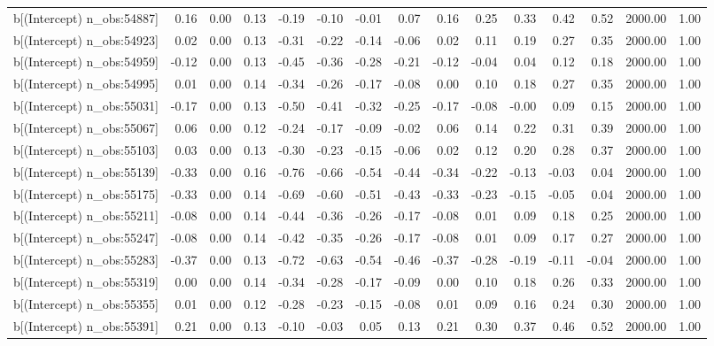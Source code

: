 \begin{table}[ht]
\begin{tabular}{rrrrrrrrrrrrrrr}
  b[(Intercept) n\_obs:54887] & 0.16 & 0.00 & 0.13 & -0.19 & -0.10 & -0.01 & 0.07 & 0.16 & 0.25 & 0.33 & 0.42 & 0.52 & 2000.00 & 1.00 \\ 
  b[(Intercept) n\_obs:54923] & 0.02 & 0.00 & 0.13 & -0.31 & -0.22 & -0.14 & -0.06 & 0.02 & 0.11 & 0.19 & 0.27 & 0.35 & 2000.00 & 1.00 \\ 
  b[(Intercept) n\_obs:54959] & -0.12 & 0.00 & 0.13 & -0.45 & -0.36 & -0.28 & -0.21 & -0.12 & -0.04 & 0.04 & 0.12 & 0.18 & 2000.00 & 1.00 \\ 
  b[(Intercept) n\_obs:54995] & 0.01 & 0.00 & 0.14 & -0.34 & -0.26 & -0.17 & -0.08 & 0.00 & 0.10 & 0.18 & 0.27 & 0.35 & 2000.00 & 1.00 \\ 
  b[(Intercept) n\_obs:55031] & -0.17 & 0.00 & 0.13 & -0.50 & -0.41 & -0.32 & -0.25 & -0.17 & -0.08 & -0.00 & 0.09 & 0.15 & 2000.00 & 1.00 \\ 
  b[(Intercept) n\_obs:55067] & 0.06 & 0.00 & 0.12 & -0.24 & -0.17 & -0.09 & -0.02 & 0.06 & 0.14 & 0.22 & 0.31 & 0.39 & 2000.00 & 1.00 \\ 
  b[(Intercept) n\_obs:55103] & 0.03 & 0.00 & 0.13 & -0.30 & -0.23 & -0.15 & -0.06 & 0.02 & 0.12 & 0.20 & 0.28 & 0.37 & 2000.00 & 1.00 \\ 
  b[(Intercept) n\_obs:55139] & -0.33 & 0.00 & 0.16 & -0.76 & -0.66 & -0.54 & -0.44 & -0.34 & -0.22 & -0.13 & -0.03 & 0.04 & 2000.00 & 1.00 \\ 
  b[(Intercept) n\_obs:55175] & -0.33 & 0.00 & 0.14 & -0.69 & -0.60 & -0.51 & -0.43 & -0.33 & -0.23 & -0.15 & -0.05 & 0.04 & 2000.00 & 1.00 \\ 
  b[(Intercept) n\_obs:55211] & -0.08 & 0.00 & 0.14 & -0.44 & -0.36 & -0.26 & -0.17 & -0.08 & 0.01 & 0.09 & 0.18 & 0.25 & 2000.00 & 1.00 \\ 
  b[(Intercept) n\_obs:55247] & -0.08 & 0.00 & 0.14 & -0.42 & -0.35 & -0.26 & -0.17 & -0.08 & 0.01 & 0.09 & 0.17 & 0.27 & 2000.00 & 1.00 \\ 
  b[(Intercept) n\_obs:55283] & -0.37 & 0.00 & 0.13 & -0.72 & -0.63 & -0.54 & -0.46 & -0.37 & -0.28 & -0.19 & -0.11 & -0.04 & 2000.00 & 1.00 \\ 
  b[(Intercept) n\_obs:55319] & 0.00 & 0.00 & 0.14 & -0.34 & -0.28 & -0.17 & -0.09 & 0.00 & 0.10 & 0.18 & 0.26 & 0.33 & 2000.00 & 1.00 \\ 
  b[(Intercept) n\_obs:55355] & 0.01 & 0.00 & 0.12 & -0.28 & -0.23 & -0.15 & -0.08 & 0.01 & 0.09 & 0.16 & 0.24 & 0.30 & 2000.00 & 1.00 \\ 
  b[(Intercept) n\_obs:55391] & 0.21 & 0.00 & 0.13 & -0.10 & -0.03 & 0.05 & 0.13 & 0.21 & 0.30 & 0.37 & 0.46 & 0.52 & 2000.00 & 1.00 \\ 

\end{tabular}
\end{table}
